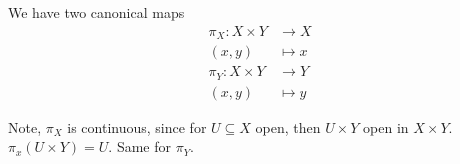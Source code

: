 \begin{remark}
    We have two canonical maps
    \begin{align*}
      \pi_X: X \times Y &\to X \\
      (x, y) &\mapsto x \\
      \pi_Y: X \times Y &\to Y \\
      (x, y) &\mapsto y
    \end{align*}

    Note, \( \pi_X \) is continuous, since
    for \( U \subseteq X \) open, then \( U \times Y \)
    open in \( X \times Y \). \( \pi_x(U \times Y ) = U \).
    Same for \( \pi_Y \).
\end{remark}
